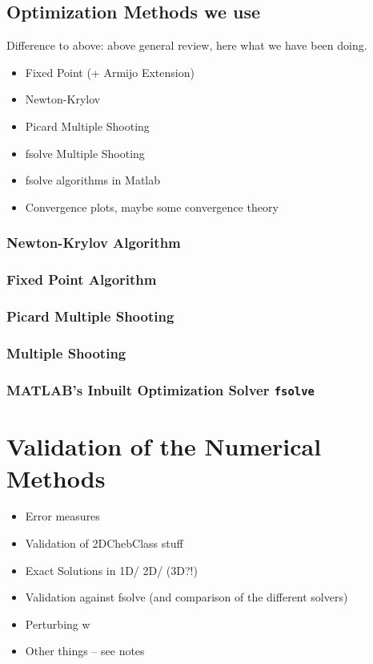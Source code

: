 \documentclass[11pt, a4paper]{article}
\theoremstyle{definition}
\begin{document}
	\subsection{Optimization Methods we use}
	Difference to above: above general review, here what we have been doing.
		\begin{itemize}
			\item Fixed Point (+ Armijo Extension)
			\item Newton-Krylov
			\item Picard Multiple Shooting
			\item fsolve Multiple Shooting 
			\item fsolve algorithms in Matlab
			\item Convergence plots, maybe some convergence theory
		\end{itemize}
	
	\subsubsection{Newton-Krylov Algorithm}
	\subsubsection{Fixed Point Algorithm}\label{sec:Method_SolverFP}	
	
	\subsubsection{Picard Multiple Shooting}
	
	\subsubsection{Multiple Shooting}
	
	\subsubsection{{\scshape MATLAB}'s Inbuilt Optimization Solver \texttt{fsolve}} \label{sec:fsolvedescription}
	
	
	
	
	
	
	
	\section{Validation of the Numerical Methods}
	\begin{itemize}
		\item Error measures
		\item Validation of 2DChebClass stuff
		\item Exact Solutions in 1D/ 2D/ (3D?!)
		\item Validation against fsolve (and comparison of the different solvers)
		\item Perturbing w
		\item Other things -- see notes
	\end{itemize}
\end{document}
